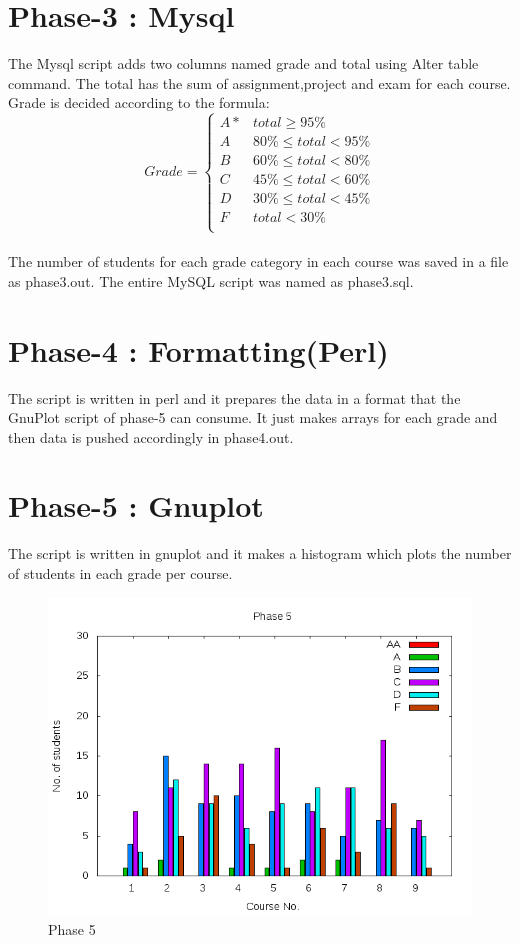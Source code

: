\documentclass[11pt]{article}
\begin{document}
 \section{Phase-3 : Mysql}
 \label{sec:ph3}
 The Mysql script adds two columns named grade and total using Alter table command. The total has the sum of assignment,project and exam for each course. Grade is decided according to the formula:\\
 $$
Grade = 
\begin{cases}
A* & total\geq95\% \\
A & 80\% \leq total < 95\% \\
B & 60\% \leq total < 80\% \\
C & 45\% \leq total < 60\% \\
D & 30\% \leq total < 45\% \\
F & total < 30\% \\
\end{cases}
$$\\
The number of students for each grade category in each course was saved in a file as phase3.out. The entire MySQL script was named as phase3.sql.

\section{Phase-4 : Formatting(Perl)}
\label{sec:ph4}
The script is written in perl and it prepares the data in a format that the GnuPlot script of phase-5 can consume. It just makes arrays for each grade and then data is pushed accordingly in phase4.out.

\section{Phase-5 : Gnuplot }
\label{sec:ph5}
The script is written in gnuplot and it makes a histogram which plots the number of students  in each grade per course.
\begin{figure}[!hb]
\centering
\includegraphics[scale=0.5]{phase5.png}
\caption{Phase 5}
\end{figure}
 
\end{document}

